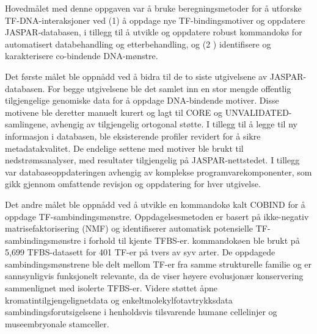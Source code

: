 \begin{xabstract}[Sammendrag]
    Hovedmålet med denne oppgaven var å bruke beregningsmetoder for å utforske TF-DNA-interaksjoner ved (1) å oppdage nye TF-bindingsmotiver og oppdatere JASPAR-databasen, i tillegg til å utvikle og oppdatere robust kommandokø for automatisert databehandling og etterbehandling, og (2 ) identifisere og karakterisere co-bindende DNA-mønstre.

    Det første målet ble oppnådd ved å bidra til de to siste utgivelsene av JASPAR-databasen. For begge utgivelsene ble det samlet inn en stor mengde offentlig tilgjengelige genomiske data for å oppdage DNA-bindende motiver. Disse motivene ble deretter manuelt kurert og lagt til CORE og UNVALIDATED-samlingene, avhengig av tilgjengelig ortogonal støtte. I tillegg til å legge til ny informasjon i databasen, ble eksisterende profiler revidert for å sikre metadatakvalitet. De endelige settene med motiver ble brukt til nedstrømsanalyser, med resultater tilgjengelig på JASPAR-nettstedet. I tillegg var databaseoppdateringen avhengig av komplekse programvarekomponenter, som gikk gjennom omfattende revisjon og oppdatering for hver utgivelse.

    Det andre målet ble oppnådd ved å utvikle en kommandokø kalt COBIND for å oppdage TF-sambindingsmønstre. Oppdagelsesmetoden er basert på ikke-negativ matrisefaktorisering (NMF) og identifiserer automatisk potensielle TF-sambindingsmønstre i forhold til kjente TFBS-er. kommandokøen ble brukt på 5,699 TFBS-datasett for 401 TF-er på tvers av syv arter. De oppdagede sambindingsmønstrene ble delt mellom TF-er fra samme strukturelle familie og er sannsynligvis funksjonelt relevante, da de viser høyere evolusjonær konservering sammenlignet med isolerte TFBS-er. Videre støttet åpne kromatintilgjengelignetdata og enkeltmolekylfotavtrykksdata sambindingsforutsigelsene i henholdsvis tilsvarende humane cellelinjer og museembryonale stamceller.

\end{xabstract}